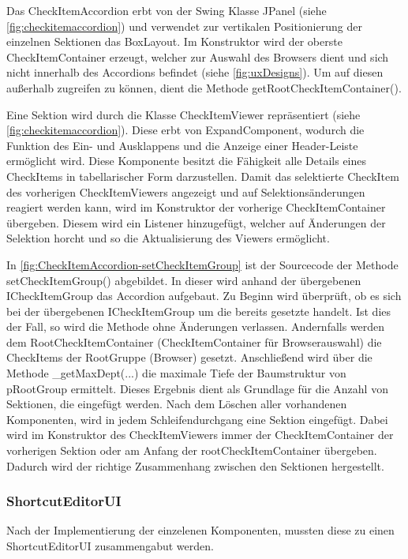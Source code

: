 Das CheckItemAccordion erbt von der Swing Klasse JPanel (siehe \autoref{fig:checkitemaccordion}) und verwendet zur vertikalen Positionierung der einzelnen Sektionen das BoxLayout. Im Konstruktor wird der oberste CheckItemContainer erzeugt, welcher zur Auswahl des Browsers dient und sich nicht innerhalb des Accordions befindet (siehe \autoref{fig:uxDesigns}). Um auf diesen außerhalb zugreifen zu können, dient die Methode getRootCheckItemContainer().

Eine Sektion wird durch die Klasse CheckItemViewer repräsentiert (siehe \autoref{fig:checkitemaccordion}). Diese erbt von ExpandComponent, wodurch die Funktion des Ein- und Ausklappens und die Anzeige einer Header-Leiste ermöglicht wird. Diese Komponente besitzt die Fähigkeit alle Details eines CheckItems in tabellarischer Form darzustellen. Damit das selektierte CheckItem des vorherigen CheckItemViewers angezeigt und auf Selektionsänderungen reagiert werden kann, wird im Konstruktor der vorherige CheckItemContainer übergeben. Diesem wird ein Listener hinzugefügt, welcher auf Änderungen der Selektion horcht und so die Aktualisierung des Viewers ermöglicht.



In \autoref{fig:CheckItemAccordion-setCheckItemGroup} ist der Sourcecode der Methode setCheckItemGroup() abgebildet. In dieser wird anhand der übergebenen ICheckItemGroup das Accordion aufgebaut. Zu Beginn wird überprüft, ob es sich bei der übergebenen ICheckItemGroup um die bereits gesetzte handelt. Ist dies der Fall, so wird die Methode ohne Änderungen verlassen. Andernfalls werden dem RootCheckItemContainer (CheckItemContainer für Browserauswahl) die CheckItems der RootGruppe (Browser) gesetzt. Anschließend wird über die Methode \_getMaxDept(...) die maximale Tiefe der Baumstruktur von pRootGroup ermittelt. Dieses Ergebnis dient als Grundlage für die Anzahl von Sektionen, die eingefügt werden. Nach dem Löschen aller vorhandenen Komponenten, wird in jedem Schleifendurchgang eine Sektion eingefügt. Dabei wird im Konstruktor des CheckItemViewers immer der CheckItemContainer der vorherigen Sektion oder am Anfang der rootCheckItemContainer übergeben. Dadurch wird der richtige Zusammenhang zwischen den Sektionen hergestellt.

\subsubsection{ShortcutEditorUI}

Nach der Implementierung der einzelenen Komponenten, mussten diese zu einen ShortcutEditorUI zusammengabut werden.

\newpage